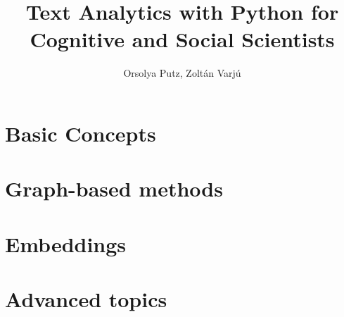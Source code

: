 \documentclass[krantz1,ChapterTOCs]{krantz}
\begin{document}
\frontmatter

\title{Text Analytics with Python for Cognitive and Social Scientists}
\author{Orsolya Putz, Zoltán Varjú}

\maketitle

%
\setcounter{page}{7} %
\tableofcontents


\listoffigures
\listoftables
%


\mainmatter

\part{Basic Concepts}






\part{Graph-based methods}



\part{Embeddings}



\part{Advanced topics}







\printindex
\end{document}
